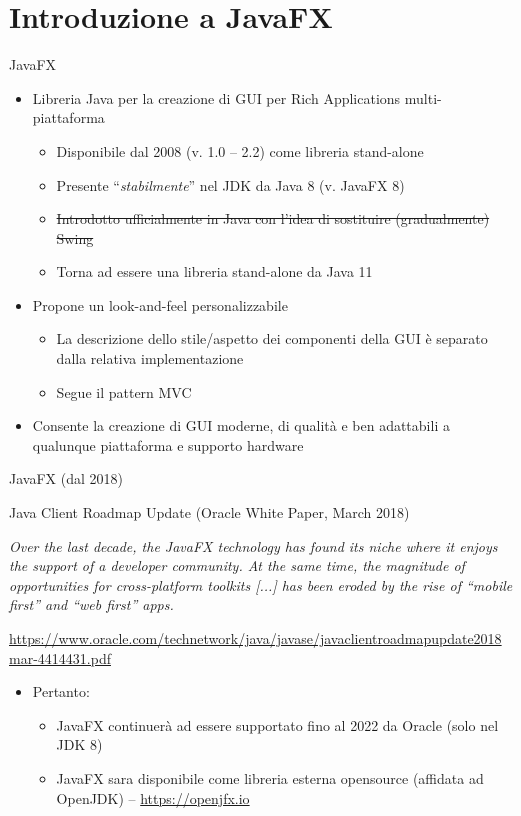\documentclass[presentation]{beamer}
\begin{document}
\section{Introduzione a JavaFX}

\begin{frame}{JavaFX}
\begin{itemize}\itemsep20pt
\item Libreria Java per la creazione di GUI per Rich Applications multi-piattaforma
\begin{itemize}
\item Disponibile dal 2008 (v. 1.0 -- 2.2) come libreria stand-alone
\item Presente ``\emph{stabilmente}'' nel JDK da Java 8 (v. JavaFX 8)
\item \st{Introdotto ufficialmente in Java con l'idea di sostituire (gradualmente) Swing}
\item Torna ad essere una libreria stand-alone da Java 11 
\end{itemize}
\item Propone un look-and-feel personalizzabile
\begin{itemize}
\item La descrizione dello stile/aspetto dei componenti della GUI è separato dalla relativa implementazione
\item Segue il pattern MVC
\end{itemize}
\item Consente la creazione di GUI moderne, di qualità e ben adattabili a qualunque piattaforma e supporto hardware
\end{itemize}
\end{frame}

\begin{frame}{JavaFX (dal 2018)}

\begin{block}{Java Client Roadmap Update (Oracle White Paper, March 2018)}
\begin{small}
\begin{center}
\emph{Over the last decade, the JavaFX technology has found its niche where it enjoys the support of a developer community. At the same time, the magnitude of opportunities for cross-platform toolkits [...] has been eroded by the rise of ``mobile first'' and ``web first'' apps.}
\begin{tiny}
\url{https://www.oracle.com/technetwork/java/javase/javaclientroadmapupdate2018mar-4414431.pdf}
\end{tiny}
\end{center}
\end{small}
\end{block}
%
\begin{itemize}
\item Pertanto:
\begin{itemize}
\item JavaFX continuerà ad essere supportato fino al 2022 da Oracle (solo nel JDK 8)
\item JavaFX sara disponibile come libreria esterna opensource (affidata ad OpenJDK) -- \url{https://openjfx.io}
\end{itemize}
\end{itemize}
\end{frame}
\end{document}
